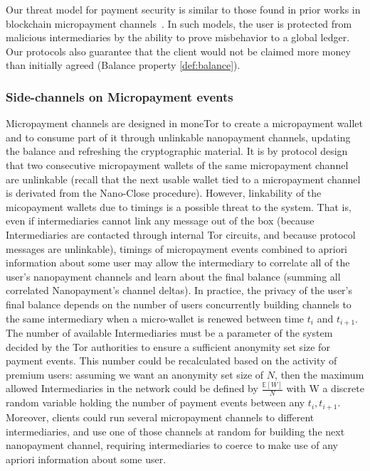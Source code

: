 Our threat model for payment security is similar to those found in prior works
in blockchain micropayment channels~\cite{poon2016bitcoin}. In such models, the
user is protected from malicious intermediaries by the ability to prove
misbehavior to a global ledger. Our protocols also guarantee that the client
would not be claimed more money than initially agreed (Balance property
\ref{def:balance}).

\subsubsection{Side-channels on Micropayment events}

Micropayment channels are designed in moneTor to create a micropayment wallet
and to consume part of it through unlinkable nanopayment channels, updating the
balance and refreshing the cryptographic material. It is by protocol design that
two consecutive micropayment wallets of the same micropayment channel are
unlinkable (recall that the next usable wallet tied to a micropayment channel is
derivated from the Nano-Close procedure). However, linkability of the
micopayment wallets due to timings is a possible threat to the system. That is,
even if intermediaries cannot link any message out of the box (because
Intermediaries are contacted through internal Tor circuits, and because protocol
messages are unlinkable), timings of micropayment events combined to apriori
information about some user may allow the intermediary to correlate all of the
user's nanopayment channels and learn about the final balance (summing all
correlated Nanopayment's channel deltas). In practice, the privacy of the user's
final balance depends on the number of users concurrently building channels to
the same intermediary when a micro-wallet is renewed between time $t_i$ and
$t_{i+1}$. The number of available Intermediaries must be a parameter of the
system decided by the Tor authorities to ensure a sufficient anonymity set size
for payment events. This number could be recalculated based on the activity of
premium users: assuming we want an anonymity set size of $N$, then the maximum
allowed Intermediaries in the network could be defined by
$\frac{\mathbb{E}[W]}{N}$ with W a discrete random variable holding the number
of payment events between any $t_i, t_{i+1}$. Moreover, clients could run
several micropayment channels to different intermediaries, and use one of those
channels at random for building the next nanopayment channel, requiring
intermediaries to coerce to make use of any apriori information about some user.

